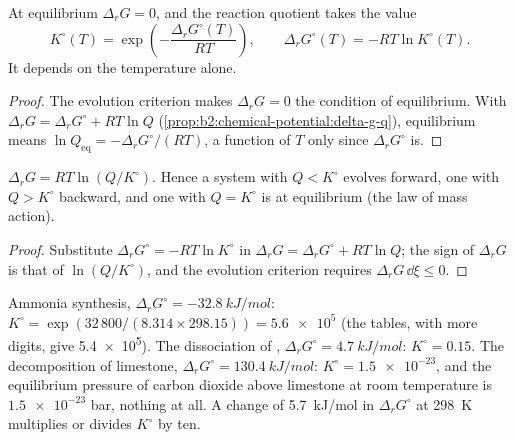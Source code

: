 \begin{theorem}\label{thm:b2:equilibrium-shifts:k-from-g}
At equilibrium $\Delta_r G = 0$, and the reaction quotient takes the value
\[
  K^\circ(T) = \exp\!\left(-\frac{\Delta_r G^\circ(T)}{RT}\right), \qquad
  \Delta_r G^\circ(T) = -RT\ln K^\circ(T) .
\]
It depends on the temperature alone.
\end{theorem}

\begin{proof}
The evolution criterion makes $\Delta_r G = 0$ the condition of equilibrium.
With $\Delta_r G = \Delta_r G^\circ + RT\ln Q$
(\cref{prop:b2:chemical-potential:delta-g-q}), equilibrium means $\ln Q_{\text{eq}}
= -\Delta_r G^\circ/(RT)$, a function of $T$ only since $\Delta_r G^\circ$ is.
\end{proof}

\begin{corollary}\label{cor:b2:equilibrium-shifts:mass-action}
$\Delta_r G = RT\ln(Q/K^\circ)$. Hence a system with $Q < K^\circ$ evolves
forward, one with $Q > K^\circ$ backward, and one with $Q = K^\circ$ is at
equilibrium (the law of mass action).
\end{corollary}

\begin{proof}
Substitute $\Delta_r G^\circ = -RT\ln K^\circ$ in $\Delta_r G = \Delta_r G^\circ
+ RT\ln Q$; the sign of $\Delta_r G$ is that of $\ln(Q/K^\circ)$, and the
evolution criterion requires $\Delta_r G\,\dd\xi \leq 0$.
\end{proof}

\begin{example}\label{ex:b2:equilibrium-shifts:constants}
Ammonia synthesis, $\Delta_r G^\circ = \qty{-32.8}{kJ/mol}$: $K^\circ =
\exp(32\,800/(8.314 \times 298.15)) = \num{5.6e5}$ (the tables, with more
digits, give \num{5.4e5}). The dissociation of , $\Delta_r G^\circ =
\qty{+4.7}{kJ/mol}$: $K^\circ = 0.15$. The decomposition of limestone,
$\Delta_r G^\circ = \qty{+130.4}{kJ/mol}$: $K^\circ = \num{1.5e-23}$, and the
equilibrium pressure of carbon dioxide above limestone at room temperature
is $\num{1.5e-23}$ bar, nothing at all. A change of \qty{5.7}{kJ/mol} in
$\Delta_r G^\circ$ at \qty{298}{K} multiplies or divides $K^\circ$ by ten.
\end{example}


